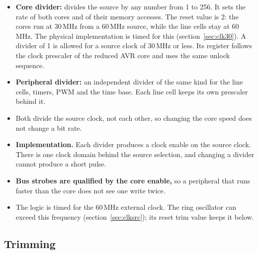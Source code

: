\documentclass[10pt,a4paper]{article}
\begin{document}
\begin{itemize}
\item \textbf{Core divider:} divides the source by any number from 1 to 256. It sets the rate of both cores and of their memory accesses. The reset value is 2: the cores run at 30\,MHz from a 60\,MHz source, while the line cells stay at 60\,MHz. The physical implementation is timed for this (section~\ref{sec:clk30}). A divider of 1 is allowed for a source clock of 30\,MHz or less. Its register follows the clock prescaler of the reduced AVR core and uses
the same unlock sequence.
\item \textbf{Peripheral divider:} an independent divider of the same kind for the line cells, timers, PWM and the time base. Each line cell keeps its own prescaler behind it.
\item Both divide the source clock, not each other, so changing the core speed does not change a bit rate.
\item \textbf{Implementation.} Each divider produces a clock enable on the source clock. There is one clock domain behind the source selection, and changing a divider cannot produce a short pulse.
\item \textbf{Bus strobes are qualified by the core enable,} so a peripheral that runs faster than the core does
not see one write twice.
\item The logic is timed for the 60\,MHz external clock. The ring oscillator can exceed this frequency
(section~\ref{sec:clksrc}); its reset trim value keeps it below.
\end{itemize}

\subsection{Trimming}\label{sec:trim}
\end{document}
